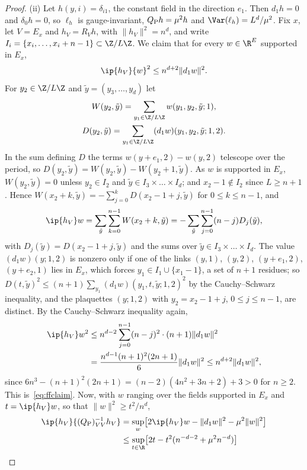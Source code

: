 \begin{proof}
(ii) Let $h(y,i)=\delta_{i1}$, the constant field in the direction $e_1$.
Then $d_1h=0$ and $\delta_0h=0$, so $\ell_h$ is gauge-invariant, $Q_{\rm P}h=
\mu^2h$ and $\Var(\ell_h)=L^d/\mu^2$. Fix $x$, let $V=E_x$ and $h_V=R_Vh$,
with $\lVert h_V\rVert^2=n^d$, and write $I_i=\{x_i,\dots,x_i+n-1\}\subset
\Z/L\Z$. We claim that for every $w\in\R^E$ supported in $E_x$,
\begin{equation}\label{eq:ffclaim}
\ip{h_V}{w}^2\le n^{d+2}\lVert d_1w\rVert^2 .
\end{equation}
For $y_2\in\Z/L\Z$ and $\tilde y=(y_3,\dots,y_d)$ let
\begin{gather*}
W(y_2,\tilde y)=\sum_{y_1\in\Z/L\Z}w(y_1,y_2,\tilde y;1),\\
D(y_2,\tilde y)=\sum_{y_1\in\Z/L\Z}(d_1w)(y_1,y_2,\tilde y;1,2).
\end{gather*}
In the sum defining $D$ the terms $w(y+e_1,2)
-w(y,2)$ telescope over the period, so $D(y_2,\tilde y)=W(y_2,\tilde y)-W(y_2
+1,\tilde y)$. As $w$ is supported in $E_x$, $W(y_2,\tilde y)=0$ unless $y_2
\in I_2$ and $\tilde y\in I_3\times\dots\times I_d$; and $x_2-1\notin I_2$
since $L\ge n+1$. Hence $W(x_2+k,\tilde y)=-\sum_{j=0}^kD(x_2-1+j,\tilde y)$
for $0\le k\le n-1$, and
\[
\ip{h_V}w=\sum_{\tilde y}\sum_{k=0}^{n-1}W(x_2+k,\tilde y)
=-\sum_{\tilde y}\sum_{j=0}^{n-1}(n-j)D_j(\tilde y),
\]
with $D_j(\tilde y)=D(x_2-1+j,\tilde y)$ and
the sums over $\tilde y\in I_3\times\dots\times I_d$.
The value $(d_1w)(y;1,2)$ is nonzero only if one of the links $(y,1)$, $(y,2)$,
$(y+e_1,2)$, $(y+e_2,1)$ lies in $E_x$, which forces $y_1\in I_1\cup\{x_1-1\}$,
a set of $n+1$ residues; so $D(t,\tilde y)^2\le(n+1)\sum_{y_1}(d_1w)(y_1,t,
\tilde y;1,2)^2$ by the Cauchy--Schwarz inequality, and the plaquettes
$(y;1,2)$ with $y_2=x_2-1+j$, $0\le j\le n-1$, are distinct. By the
Cauchy--Schwarz inequality again,
\begin{align*}
\ip{h_V}w^2&\le n^{d-2}\sum_{j=0}^{n-1}(n-j)^2\cdot(n+1)\lVert d_1w\rVert^2\\
&=\frac{n^{d-1}(n+1)^2(2n+1)}6\lVert d_1w\rVert^2\le n^{d+2}\lVert d_1w
\rVert^2,
\end{align*}
since $6n^3-(n+1)^2(2n+1)=(n-2)(4n^2+3n+2)+3>0$ for $n\ge2$. This
is~\eqref{eq:ffclaim}. Now, with $w$ ranging over the fields supported in
$E_x$ and $t=\ip{h_V}w$, so that $\lVert w\rVert^2\ge t^2/n^d$,
\begin{align*}
\ip{h_V}{(Q_{\rm P})_{VV}^{-1}h_V}&=\sup_w\bigl[2\ip{h_V}w-\lVert d_1w\rVert^2
-\mu^2\lVert w\rVert^2\bigr]\\
&\le\sup_{t\in\R}\bigl[2t-t^2(n^{-d-2}+\mu^2n^{-d})\bigr]\\

\end{align*}
\end{proof}
